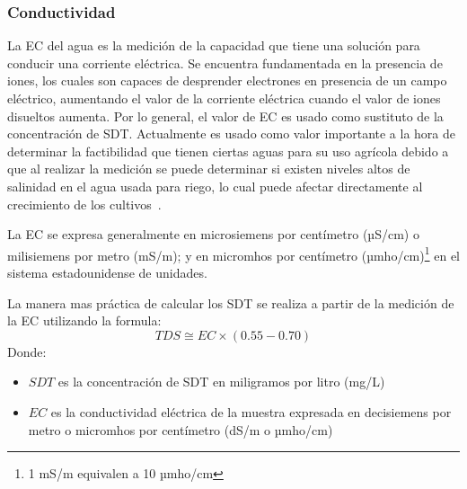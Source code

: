 \subsubsection{Conductividad}
La \gls{EC} del agua es la medición de la capacidad que tiene una solución para conducir una corriente eléctrica. Se encuentra fundamentada en la presencia de iones, los cuales son capaces de desprender electrones en presencia de un campo eléctrico, aumentando el valor de la corriente eléctrica cuando el valor de iones disueltos aumenta. Por lo general, el valor de EC es usado como sustituto de la concentración de SDT. Actualmente es usado como valor importante a la hora de determinar la factibilidad que tienen ciertas aguas para su uso agrícola debido a que al realizar la medición se puede determinar si existen niveles altos de salinidad en el agua usada para riego, lo cual puede afectar directamente al crecimiento de los cultivos~\citep{metcalf2003}.\par
La EC se expresa generalmente en microsiemens por centímetro (µS/cm) o milisiemens por metro (mS/m); y en micromhos por centímetro (µmho/cm)\footnote{1 mS/m equivalen a 10 µmho/cm} en el sistema estadounidense de unidades.\par
La manera mas práctica de calcular los \gls{SDT} se realiza a partir de la medición de la \gls{EC} utilizando la formula:
\begin{equation*}
	TDS \cong EC \times (0.55 - 0.70)
\end{equation*}
Donde:
\begin{itemize}
	\item $SDT$ es la concentración de \acrlong{SDT} en miligramos por litro (mg/L)
	\item $EC$ es la conductividad eléctrica de la muestra expresada en decisiemens por metro o micromhos por centímetro (dS/m o µmho/cm)
\end{itemize}
